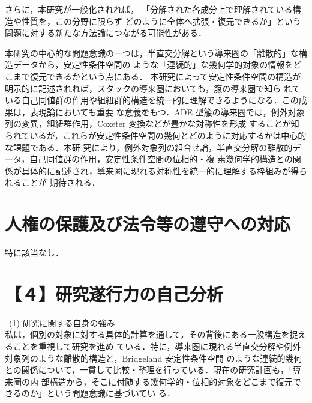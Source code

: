 \documentclass[11pt,a4paper]{ltjsarticle}
\newcommand{\研究課題名}{軌道体射影直線の導来圏の半直交分解とBridgeland安定性条件に関する研究}
\newcommand{\研究機関名}{大阪大学}
\newcommand{\研究代表者氏名}{山本 雄大}
\begin{document}
さらに，本研究が一般化されれば，
「分解された各成分上で理解されている構造や性質を，この分野に限らず
どのように全体へ拡張・復元できるか」という問題に対する新たな方法論につながる可能性がある．

本研究の中心的な問題意識の一つは，半直交分解という導来圏の「離散的」な構造データから，安定性条件空間の
ような「連続的」な幾何学的対象の情報をどこまで復元できるかという点にある．
本研究によって安定性条件空間の構造が明示的に記述されれば，スタックの導来圏においても，箙の導来圏で知ら
れている自己同値群の作用や組紐群的構造を統一的に理解できるようになる．この成果は，表現論においても重要
な意義をもつ．ADE 型箙の導来圏では，例外対象列の変異，組紐群作用，Coxeter 変換などが豊かな対称性を形成
することが知られているが，これらが安定性条件空間の幾何とどのように対応するかは中心的な課題である．本研
究により，例外対象列の組合せ論，半直交分解の離散的データ，自己同値群の作用，安定性条件空間の位相的・複
素幾何学的構造との関係が具体的に記述され，導来圏に現れる対称性を統一的に理解する枠組みが得られることが
期待される．




\section{人権の保護及び法令等の遵守への対応}

特に該当なし．





\section{【４】研究遂行力の自己分析}

\noindent
\bullet\ (1) 研究に関する自身の強み\\
私は，個別の対象に対する具体的計算を通して，その背後にある一般構造を捉えることを重視して研究を進め
ている．特に，導来圏に現れる半直交分解や例外対象列のような離散的構造と，Bridgeland 安定性条件空間
のような連続的幾何との関係について，一貫して比較・整理を行っている．現在の研究計画も，「導来圏の内
部構造から，そこに付随する幾何学的・位相的対象をどこまで復元できるのか」という問題意識に基づいてい
る．
\end{document}
